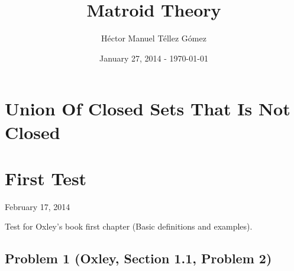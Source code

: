 \frontmatter
\title{Matroid Theory}
\author{Héctor Manuel Téllez Gómez}
\date{January 27, 2014 - \today}
\maketitle

\tableofcontents

\mainmatter


\chapter{Union Of Closed Sets That Is Not Closed}


\chapter{First Test}
    \begin{center} February 17, 2014 \end{center}
    Test for Oxley's book first chapter (Basic definitions and examples). 
    \section{Problem 1 (Oxley, Section 1.1, Problem 2)}
    